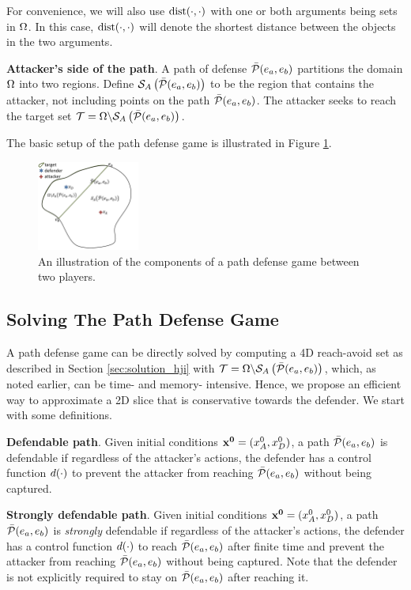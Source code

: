 For convenience, we will also use $\text{dist}(\cdot,\cdot)$ with one or both arguments being sets in $\Omega$. In this case, $\text{dist}(\cdot,\cdot)$ will denote the shortest distance between the objects in the two arguments.

\begin{defn} %
\textbf{Attacker's side of the path}. A path of defense $\bar{\mathcal{P}}(e_a,e_b)$ partitions the domain $\Omega$ into two regions. Define $\mathcal{S}_A\left(\bar{\mathcal{P}}(e_a,e_b)\right)$ to be the region that contains the attacker, not including points on the path $\bar{\mathcal{P}}(e_a,e_b)$. The attacker seeks to reach the target set $\mathcal{T}=\Omega\backslash\mathcal{S}_A\left(\bar{\mathcal{P}}(e_a,e_b)\right)$.
\end{defn}

The basic setup of the path defense game is illustrated in Figure \ref{fig:pd_form}.
\begin{figure}
\centering
\includegraphics[width=0.3\textwidth]{"fig/path defense game"}
\caption{An illustration of the components of a path defense game between two players.}
\label{fig:pd_form}
\end{figure}

\subsection{Solving The Path Defense Game}
A path defense game can be directly solved by computing a 4D reach-avoid set as described in Section \ref{sec:solution_hji} with $\mathcal{T}=\Omega\backslash\mathcal{S}_A\left(\bar{\mathcal{P}}(e_a,e_b)\right)$, which, as noted earlier, can be time- and memory- intensive. Hence, we propose an efficient way to approximate a 2D slice that is conservative towards the defender. We start with some definitions.

\begin{defn} %
\textbf{Defendable path}. Given initial conditions $\mathbf{x^0}=(x_A^0,x_D^0)$, a path $\bar{\mathcal{P}}(e_a,e_b)$ is defendable if regardless of the attacker's actions, the defender has a control function $d(\cdot)$ to prevent the attacker from reaching $\bar{\mathcal{P}}(e_a,e_b)$ without being captured.
\end{defn}

\begin{defn} %
\textbf{Strongly defendable path}. Given initial conditions $\mathbf{x^0}=(x_A^0,x_D^0)$, a path $\bar{\mathcal{P}}(e_a,e_b)$ is \textit{strongly} defendable if regardless of the attacker's actions, the defender has a control function $d(\cdot)$ to reach $\bar{\mathcal{P}}(e_a,e_b)$ after finite time and prevent the attacker from reaching $\bar{\mathcal{P}}(e_a,e_b)$ without being captured. Note that the defender is not explicitly required to stay on $\bar{\mathcal{P}}(e_a,e_b)$ after reaching it.
\end{defn}

